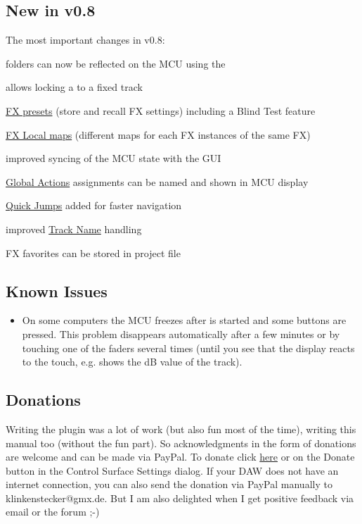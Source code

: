 \subsection{New in v0.8}

The most important changes in v0.8:
\begin{compactitem}
\item \reaper folders can now be reflected on the MCU using the \foldermode
\item \anchors allows locking a \cs to a fixed track
\item \hyperref[fxpresets]{FX presets} (store and recall FX settings) including
a Blind Test feature
\item \hyperref[localmaps]{FX Local maps} (different maps for each FX
instances of the same FX)
\item improved syncing of the MCU state with the \reaper GUI
\item \hyperref[globalactions]{Global Actions} assignments can be named and
shown in MCU display
\item \hyperref[quickjump]{Quick Jumps} added for faster navigation  
\item improved \hyperref[tracknames]{Track Name} handling
\item FX favorites can be stored in \reaper project file
\end{compactitem}

\subsection{Known Issues}
\begin{itemize}
\item On some computers the MCU freezes after  \reaper is started and
  some buttons are pressed. This problem disappears automatically after
  a few minutes or by touching one of the faders several times (until you
  see that the display reacts to the touch, e.g. shows the dB
  value of the track).
\end{itemize}

\subsection{Donations}

Writing the plugin was a lot of work (but also fun most of the time), writing this
manual too (without the fun part). So acknowledgments in the form of donations are
welcome and can be made via PayPal. To donate click
\href{https://www.paypal.com/cgi-bin/webscr?cmd=_s-xclick&hosted_button_id=LR54GZHGL6VHA}{here}
or on the Donate button in the Control Surface
Settings dialog. If your DAW does not have an internet connection, you can also
send the donation via PayPal manually to klinkenstecker@gmx.de. But I am also
delighted when I get positive feedback via email or the \reaper forum ;-)


